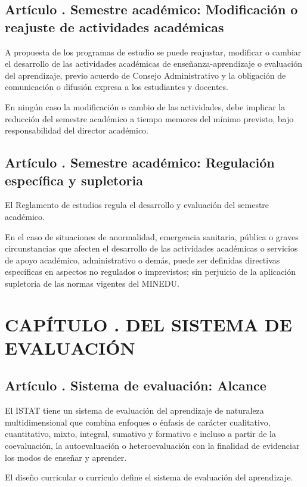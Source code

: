 \subsection{Artículo . Semestre académico: Modificación o reajuste de actividades académicas}
\addtocounter{ns}{1}
A propuesta de los programas de estudio se puede reajustar, modificar o cambiar el desarrollo de las actividades académicas de enseñanza-aprendizaje o evaluación del aprendizaje, previo acuerdo de Consejo Administrativo y la obligación de comunicación o difusión expresa a los estudiantes y docentes. 

En ningún caso la modificación o cambio de las actividades, debe implicar la reducción del semestre académico a tiempo memores del mínimo previsto, bajo responsabilidad del director académico. 
\subsection{Artículo . Semestre académico: Regulación específica y supletoria}
\addtocounter{ns}{1}
El Reglamento de estudios regula el desarrollo y evaluación del semestre académico.
  
En el caso de situaciones de anormalidad, emergencia sanitaria, pública o graves circunstancias que afecten el desarrollo de las actividades académicas o servicios de apoyo académico, administrativo o demás, puede ser definidas directivas específicas en aspectos no regulados o imprevistos; sin perjuicio de la aplicación supletoria de las normas vigentes del MINEDU.  
\section{CAPÍTULO . DEL SISTEMA DE EVALUACIÓN}
\addtocounter{re}{1}

\subsection{Artículo . Sistema de evaluación: Alcance}
\addtocounter{ns}{1}
El ISTAT tiene un sistema de evaluación del aprendizaje de naturaleza multidimensional que combina enfoques o énfasis de carácter cualitativo, cuantitativo, mixto, integral, sumativo y formativo e incluso a partir de la coevaluación, la autoevaluación o heteroevaluación con la finalidad de evidenciar los modos de enseñar y aprender.

El diseño curricular o currículo define el sistema de evaluación del aprendizaje. 

